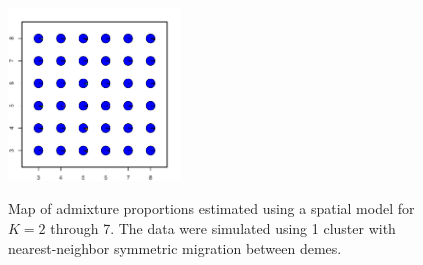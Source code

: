 \documentclass[12pt]{article}
\begin{document}
\begin{figure}
			{\includegraphics[width=1.8in,height=1.8in]{figs/sims/simK1_sp_pies_K7.pdf}}
	\caption{
	Map of admixture proportions estimated using a spatial model for $K=2$ through 7.
	The data were simulated using 1 cluster with nearest-neighbor symmetric migration between demes.
    }\label{simK1_sp_pies}
\end{figure}
\end{document}
